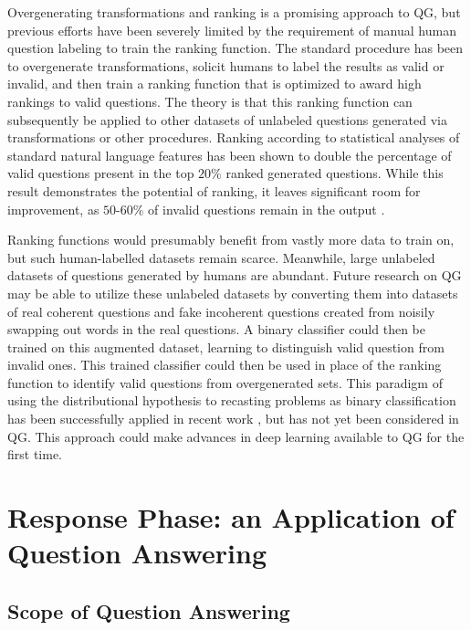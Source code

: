 Overgenerating transformations and ranking is a promising approach to QG, but previous efforts have been severely limited by the requirement of manual human question labeling to train the ranking function. The standard procedure has been to overgenerate transformations, solicit humans to label the results as valid or invalid, and then train a ranking function that is optimized to award high rankings to valid questions. The theory is that this ranking function can subsequently be applied to other datasets of unlabeled questions generated via transformations or other procedures. Ranking according to statistical analyses of standard natural language features has been shown to double the percentage of valid questions present in the top $20$\% ranked generated questions. While this result demonstrates the potential of ranking, it leaves significant room for improvement, as $50$-$60$\% of invalid questions remain in the output  \citep{heilman2011automatic}. 

Ranking functions would presumably benefit from vastly more data to train on, but such human-labelled datasets remain scarce. Meanwhile, large unlabeled datasets of questions generated by humans are abundant. Future research on QG may be able to utilize these unlabeled datasets by converting them into datasets of real coherent questions and fake incoherent questions created from noisily swapping out words in the real questions. A binary classifier could then be trained on this augmented dataset, learning to distinguish valid question from invalid ones. This trained classifier could then be used in place of the ranking function to identify valid questions from overgenerated sets. This paradigm of using the distributional hypothesis to recasting problems as binary classification has been successfully applied in recent work  \citep{collobert2011natural}, but has not yet been considered in QG. This approach could make advances in deep learning available to QG for the first time. 

\section{Response Phase: an Application of Question Answering}

\subsection{Scope of Question Answering}

